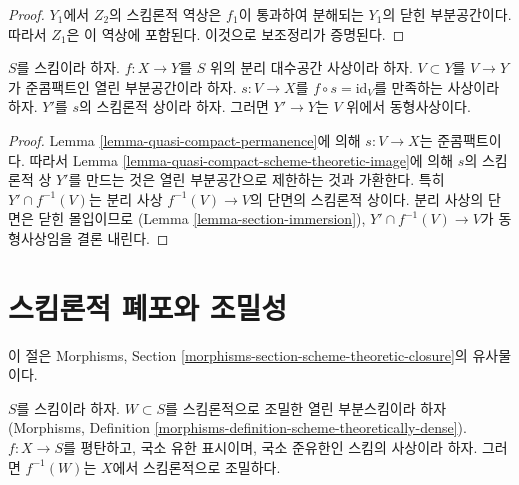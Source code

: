 \begin{proof}
$Y_1$에서 $Z_2$의 스킴론적 역상은 $f_1$이 통과하여 분해되는
$Y_1$의 닫힌 부분공간이다. 따라서 $Z_1$은 이 역상에 포함된다.
이것으로 보조정리가 증명된다.
\end{proof}

\begin{lemma}
\label{lemma-scheme-theoretic-image-of-partial-section}
$S$를 스킴이라 하자.
$f : X \to Y$를 $S$ 위의 분리 대수공간 사상이라 하자.
$V \subset Y$를 $V \to Y$가 준콤팩트인 열린 부분공간이라 하자.
$s : V \to X$를 $f \circ s = \text{id}_V$를 만족하는 사상이라 하자.
$Y'$를 $s$의 스킴론적 상이라 하자.
그러면 $Y' \to Y$는 $V$ 위에서 동형사상이다.
\end{lemma}

\begin{proof}
Lemma \ref{lemma-quasi-compact-permanence}에 의해
$s : V \to X$는 준콤팩트이다.
따라서 Lemma \ref{lemma-quasi-compact-scheme-theoretic-image}에 의해
$s$의 스킴론적 상 $Y'$를 만드는 것은 열린 부분공간으로 제한하는 것과
가환한다. 특히 $Y' \cap f^{-1}(V)$는 분리 사상
$f^{-1}(V) \to V$의 단면의 스킴론적 상이다.
분리 사상의 단면은 닫힌 몰입이므로
(Lemma \ref{lemma-section-immersion}), $Y' \cap f^{-1}(V) \to V$가
동형사상임을 결론 내린다.
\end{proof}

\section{스킴론적 폐포와 조밀성}
\label{section-scheme-theoretic-closure}

\noindent
이 절은 Morphisms, Section
\ref{morphisms-section-scheme-theoretic-closure}의 유사물이다.

\begin{lemma}
\label{lemma-scheme-theoretically-dense-representable}
$S$를 스킴이라 하자. $W \subset S$를 스킴론적으로 조밀한
열린 부분스킴이라 하자
(Morphisms, Definition
\ref{morphisms-definition-scheme-theoretically-dense}).
$f : X \to S$를 평탄하고, 국소 유한 표시이며, 국소 준유한인
스킴의 사상이라 하자.
그러면 $f^{-1}(W)$는 $X$에서 스킴론적으로 조밀하다.
\end{lemma}

